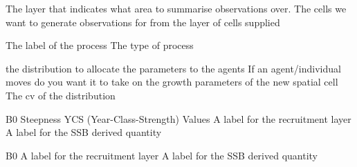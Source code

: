  {The layer that indicates what area to summarise observations over.}
 {The cells we want to generate observations for from the layer of cells supplied}
\par\par
{} {The label of the process}
 {The type of process}
\par\textbf{}\par
{} {the distribution to allocate the parameters to the agents}
 {If an agent/individual moves do you want it to take on the growth parameters of the new spatial cell}
 {The cv of the distribution}
\par\textbf{}\par
\par\textbf{}\par
\par\textbf{}\par
\par\textbf{}\par
\par\textbf{}\par
\par\textbf{}\par
\par\textbf{}\par
{} {B0}
 {Steepness}
 {YCS (Year-Class-Strength) Values}
 {A label for the recruitment layer}
 {A label for the SSB derived quantity}
\par\textbf{}\par
{} {B0}
 {A label for the recruitment layer}
 {A label for the SSB derived quantity}
\par\textbf{}\par
